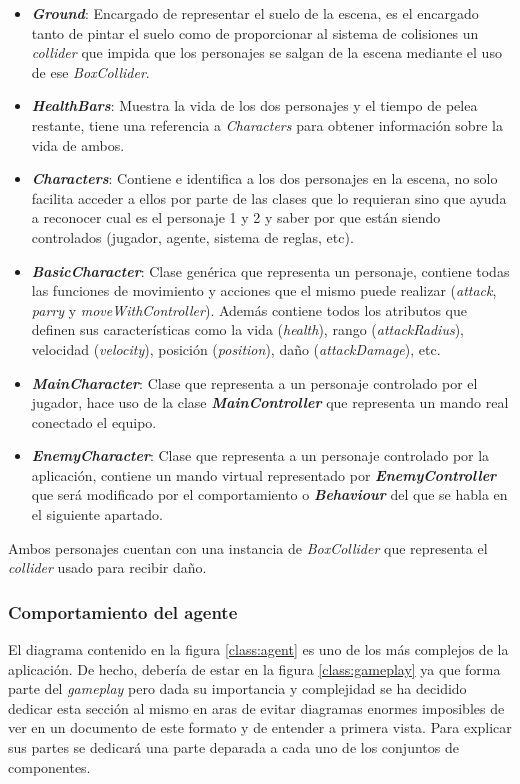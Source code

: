 \begin{itemize}
	\item \textbf{\textit{Ground}}: Encargado de representar el suelo de la escena, es el encargado tanto de pintar el suelo como de proporcionar al sistema de colisiones un \textit{collider} que impida que los personajes se salgan de la escena mediante el uso de ese \textit{BoxCollider}.
	\item \textbf{\textit{HealthBars}}: Muestra la vida de los dos personajes y el tiempo de pelea restante, tiene una referencia a \textit{Characters} para obtener información sobre la vida de ambos.
	\item \textbf{\textit{Characters}}: Contiene e identifica a los dos personajes en la escena, no solo facilita acceder a ellos por parte de las clases que lo requieran sino que ayuda a reconocer cual es el personaje 1 y 2 y saber por que están siendo controlados (jugador, agente, sistema de reglas, etc).
	\item \textbf{\textit{BasicCharacter}}: Clase genérica que representa un personaje, contiene todas las funciones de movimiento y acciones que el mismo puede realizar (\textit{attack}, \textit{parry} y \textit{moveWithController}). Además contiene todos los atributos que definen sus características como la vida (\textit{health}), rango (\textit{attackRadius}), velocidad (\textit{velocity}), posición (\textit{position}), daño (\textit{attackDamage}), etc. 
	\item \textbf{\textit{MainCharacter}}: Clase que representa a un personaje controlado por el jugador, hace uso de la clase \textbf{\textit{MainController}} que representa un mando real conectado el equipo.
	\item \textbf{\textit{EnemyCharacter}}: Clase que representa a un personaje controlado por la aplicación, contiene un mando virtual representado por \textbf{\textit{EnemyController}} que será modificado por el comportamiento o \textbf{\textit{Behaviour}} del que se habla en el siguiente apartado.
\end{itemize}

\bigskip

Ambos personajes cuentan con una instancia de \textit{BoxCollider} que representa el \textit{collider} usado para recibir daño.

\subsubsection*{Comportamiento del agente}
\label{cap:diseno:agente}
El diagrama contenido en la figura \ref{class:agent} es uno de los más complejos de la aplicación. De hecho, debería de estar en la figura \ref{class:gameplay} ya que forma parte del \textit{gameplay} pero dada su importancia y complejidad se ha decidido dedicar esta sección al mismo en aras de evitar diagramas enormes imposibles de ver en un documento de este formato y de entender a primera vista. Para explicar sus partes se dedicará una parte deparada a cada uno de los conjuntos de componentes.

